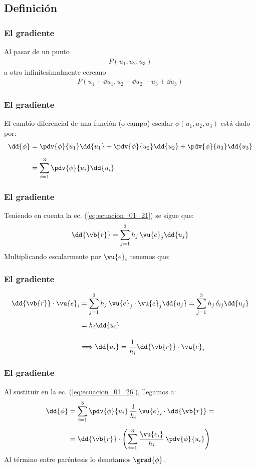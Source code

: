 \subsection{Definición}
\begin{frame}
\frametitle{El gradiente}
Al pasar de un punto 
\begin{align*}
P(u_{1}, u_{2}, u_{3})
\end{align*}
a otro infinitesimalmente cercano 
\begin{align*}
P(u_{1} + \dd{u}_{1}, u_{2} + \dd{u_{2}} + u_{3} + \dd{u_{3}})
\end{align*}
\end{frame}
\begin{frame}
\frametitle{El gradiente}
El cambio diferencial de una función (o campo) escalar $\phi(u_{1}, u_{2}, u_{3})$ está dado por:
\begin{align}
\begin{aligned}
\dd{\phi} &= \pdv{\phi}{u_{1}} \dd{u_{1}} + \pdv{\phi}{u_{2}} \dd{u_{2}} + \pdv{\phi}{u_{3}} \dd{u_{3}} \\[0.5em]
&= \sum_{i=1}^{3} \pdv{\phi}{u_{i}} \dd{u_{i}}
\end{aligned}
\label{eq:ecuacion_01_26}
\end{align}
\end{frame}
\begin{frame}
\frametitle{El gradiente}
Teniendo en cuenta la ec. (\ref{eq:ecuacion_01_21}) se sigue que:
\begin{align}
\dd{\vb{r}} = \sum_{j=1}^{3} h_{j} \, \vu{e}_{j} \dd{u_{j}}
\label{eq:ecuacion_01_27}
\end{align}
\pause
Multiplicando escalarmente por $\vu{e}_{i}$ tenemos que:
\end{frame}
\begin{frame}
\frametitle{El gradiente}
\begin{align*}
\dd{\vb{r}} \cdot \vu{e}_{i} &= \sum_{j=1}^{3} h_{j} \, \vu{e}_{j} \cdot \vu{e}_{j} \dd{u_{j}} = \sum_{j=1}^{3} h_{j} \, \delta_{ij} \dd{u_{j}} \\[0.5em]
&= h_{i} \dd{u_{i}} \\[1em]
&\Longrightarrow \dd{u_{i}} = \dfrac{1}{h_{i}} \dd{\vb{r}} \cdot \vu{e}_{i}
\end{align*}
\end{frame}
\begin{frame}
\frametitle{El gradiente}
Al sustituir en la ec. (\ref{eq:ecuacion_01_26}), llegamos a:
\begin{align*}
\dd{\phi} &= \sum_{i=1}^{3} \pdv{\phi}{u_{i}} \, \dfrac{1}{h_{i}} \, \vu{e}_{i} \cdot \dd{\vb{r}} = \\[0.5em]
&= \dd{\vb{r}} \cdot \left( \sum_{i=1}^{3} \dfrac{\vu{e_{i}}}{h_{i}} \, \pdv{\phi}{u_{i}} \right)
\end{align*}
\pause
Al término entre paréntesis lo denotamos $\grad{\phi}$.
\end{frame}
